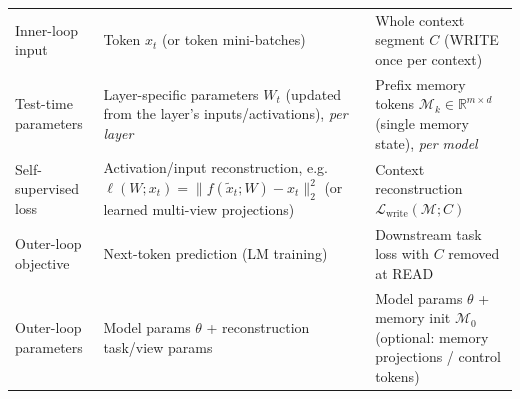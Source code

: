 \documentclass{article}
\theoremstyle{plain}
\theoremstyle{definition}
\theoremstyle{remark}
\begin{document}
{\begin{table}[h]
\begin{tabularx}{\linewidth}{lXX}
Inner-loop input
& Token $x_t$ (or token mini-batches)
& Whole context segment $C$ (WRITE once per context) \\

Test-time parameters
& Layer-specific parameters $W_t$ (updated from the layer's inputs/activations), \emph{per layer}
& Prefix memory tokens $\mathcal{M}_k \in \mathbb{R}^{m \times d}$ (single memory state), \emph{per model} \\

Self-supervised loss
& Activation/input reconstruction, e.g. $\ell(W;x_t)=\|f(\tilde{x}_t;W)-x_t\|_2^2$
(or learned multi-view projections)
& Context reconstruction $\mathcal{L}_{\text{write}}(\mathcal{M};C)$ \\

Outer-loop objective
& Next-token prediction (LM training)
& Downstream task loss with $C$ removed at READ \\

Outer-loop parameters
& Model params $\theta$ + reconstruction task/view params
& Model params $\theta$ + memory init $\mathcal{M}_0$ (optional: memory projections / control tokens) \\

\bottomrule
\end{tabularx}
\label{tab:ttt_comparison}
\end{table}


}
\end{document}
